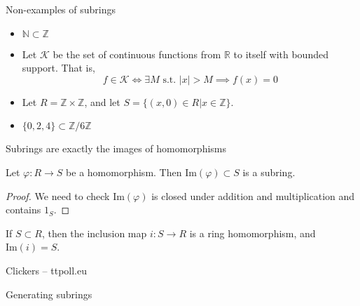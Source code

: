 \documentclass{beamer}
\newcommand{\Z}{\mathbb{Z}}
\begin{document}
\begin{frame}{Non-examples of subrings}

\begin{itemize}
\item $\mathbb{N}\subset\mathbb{Z}$ 
\item Let $\mathcal{K}$ be the set of continuous functions from $\mathbb{R}$ to itself with bounded support.  That is,
$$f\in \mathcal{K} \iff \exists M \textrm{ s.t. } |x|>M\implies  f(x)=0 $$
\item Let $R=\mathbb{Z}\times \mathbb{Z}$, and let $S=\{(x,0)\in R | x\in \mathbb{Z}\}$.  
\item $\{0,2,4\}\subset\Z/6\Z$
\end{itemize}
\end{frame}

\begin{frame}{Subrings are exactly the images of homomorphisms}

\begin{lemma} Let $\varphi:R\to S$ be a homomorphism.  Then $\textrm{Im}(\varphi)\subset S$ is a subring.
\end{lemma}

\begin{proof}
We need to check $\textrm{Im}(\varphi)$ is closed under addition and multiplication and contains $1_S$.
\end{proof}

\begin{lemma} If $S\subset R$, then the inclusion map $i:S\to R$ is a ring homomorphism, and $\textrm{Im}(i)=S$.
  \end{lemma}
\end{frame}



\begin{frame}[plain,c]

\begin{center}

\Huge

Clickers -- ttpoll.eu
\end{center}

\end{frame}


\begin{frame}[plain,c]

\begin{center}

\Huge

Generating subrings
\end{center}

\end{frame}
\end{document}
